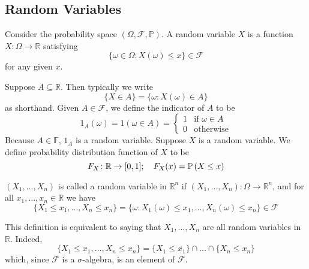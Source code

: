 \subsection{Random Variables}
\begin{definition}
	Consider the probability space \((\Omega, \mathcal F, \mathbb P)\).
	A random variable \(X\) is a function \(X \colon \Omega \to \mathbb R\) satisfying
	\[
		\{ \omega \in \Omega \colon X(\omega) \leq x \} \in \mathcal F
	\]
	for any given \(x\).
\end{definition}
\noindent Suppose \(A \subseteq \mathbb R\).
Then typically we write
\[
	\{ X \in A \} = \{ \omega \colon X(\omega) \in A \}
\]
as shorthand.
Given \(A \in \mathcal F\), we define the indicator of \(A\) to be
\[
	1_A(\omega) = 1(\omega \in A) = \begin{cases}
		1 & \text{if } \omega \in A \\
		0 & \text{otherwise}
	\end{cases}
\]
Because \(A \in \mathbb F\), \(1_A\) is a random variable.
Suppose \(X\) is a random variable.
We define probability distribution function of \(X\) to be
\[
	F_X \colon \mathbb R \to [0, 1];\quad F_X(x) = \mathbb{P}\left({X \leq x}\right)
\]
\begin{definition}
	\((X_1, \dots, X_n)\) is called a random variable in \(\mathbb R^n\) if \((X_1, \dots, X_n) \colon \Omega \to \mathbb R^n\), and for all \(x_1, \dots, x_n \in \mathbb R\) we have
	\[
		\{ X_1 \leq x_1, \dots, X_n \leq x_n \} = \{ \omega \colon X_1(\omega) \leq x_1, \dots, X_n(\omega) \leq x_n \} \in \mathcal F
	\]
\end{definition}
\noindent This definition is equivalent to saying that \(X_1, \dots, X_n\) are all random variables in \(\mathbb R\).
Indeed,
\[
	\{ X_1 \leq x_1, \dots, X_n \leq x_n \} = \{ X_1 \leq x_1 \} \cap \dots \cap \{ X_n \leq x_n \}
\]
which, since \(\mathcal F\) is a \(\sigma\)-algebra, is an element of \(\mathcal F\).
